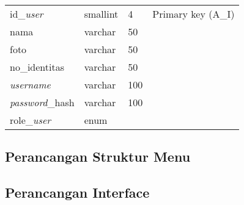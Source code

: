 \begin{enumerate}
{\begin{longtable}{l l l l}
				      id\_\textit{user}       & smallint               & 4                        & Primary key (A\_I)                       \\
				      nama                    & varchar                & 50                       &                                          \\
				      foto                    & varchar                & 50                       &                                          \\
				      no\_identitas           & varchar                & 50                       &                                          \\
				      \textit{username}       & varchar                & 100                      &                                          \\
				      \textit{password}\_hash & varchar                & 100                      &                                          \\
				      role\_\textit{user}     & enum                   &                          &                                          \\
				      \hline
			      \end{longtable}
		      }

\end{enumerate}

\subsection{Perancangan Struktur Menu}
\subsection{Perancangan Interface}